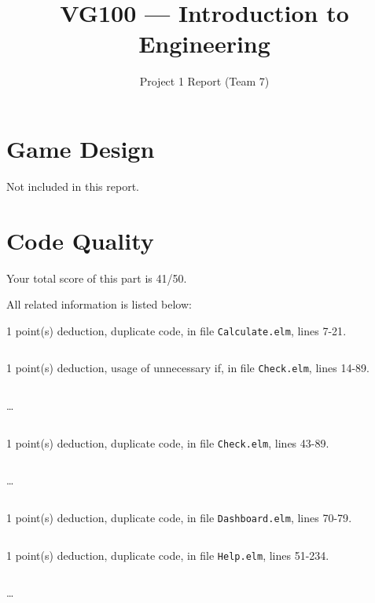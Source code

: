 \documentclass{article}
\title{VG100 --- Introduction to\\ Engineering}
\subtitle{Project 1 Report (Team 7)}
\begin{document}
\maketitle

\section{Game Design}

Not included in this report.

\section{Code Quality}

Your total score of this part is 41/50. \medskip

All related information is listed below: \medskip

1 point(s) {\color{red}deduction}, duplicate code, in file {\color{blue}\texttt{Calculate.elm}}, lines {\color{blue}7-21}.

\inputminted[firstline=7,lastline=21]{elm}{Calculate.elm}

1 point(s) {\color{red}deduction}, usage of unnecessary if, in file {\color{blue}\texttt{Check.elm}}, lines {\color{blue}14-89}.

\inputminted[firstline=14,lastline=23]{elm}{Check.elm}

\dots

\inputminted[firstline=80,lastline=89]{elm}{Check.elm}

1 point(s) {\color{red}deduction}, duplicate code, in file {\color{blue}\texttt{Check.elm}}, lines {\color{blue}43-89}.

\inputminted[firstline=43,lastline=52]{elm}{Check.elm}

\dots

\inputminted[firstline=80,lastline=89]{elm}{Check.elm}

1 point(s) {\color{red}deduction}, duplicate code, in file {\color{blue}\texttt{Dashboard.elm}}, lines {\color{blue}70-79}.

\inputminted[firstline=70,lastline=79]{elm}{Dashboard.elm}

1 point(s) {\color{red}deduction}, duplicate code, in file {\color{blue}\texttt{Help.elm}}, lines {\color{blue}51-234}.

\inputminted[firstline=51,lastline=60]{elm}{Help.elm}

\dots

\inputminted[firstline=225,lastline=234]{elm}{Help.elm}
\end{document}
